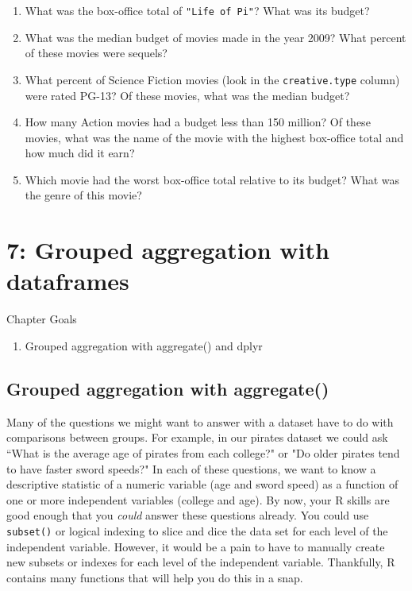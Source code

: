 \documentclass{tufte-book}\usepackage[]{graphicx}\usepackage[]{color}
\begin{document}
\begin{enumerate}

\item What was the box-office total of \texttt{"Life of Pi"}? What was its budget?

\item What was the median budget of movies made in the year 2009? What percent of these movies were sequels?

\item What percent of Science Fiction movies (look in the \texttt{creative.type} column) were rated PG-13? Of these movies, what was the median budget?

\item How many Action movies had a budget less than 150 million? Of these movies, what was the name of the movie with the highest box-office total and how much did it earn?

\item Which movie had the worst box-office total relative to its budget? What was the genre of this movie?

\end{enumerate}




\chapter{7: Grouped aggregation with dataframes}
\label{ch:7}


Chapter Goals

\begin{enumerate}
  \item Grouped aggregation with aggregate() and dplyr
\end{enumerate}

\section{Grouped aggregation with aggregate()}

Many of the questions we might want to answer with a dataset have to do with comparisons between groups. For example, in our pirates dataset we could ask ``What is the average age of pirates from each college?" or "Do older pirates tend to have faster sword speeds?" In each of these questions, we want to know a descriptive statistic of a numeric variable (age and sword speed) as a function of one or more independent variables (college and age). By now, your R skills are good enough that you \textit{could} answer these questions already. You could use \texttt{subset()} or logical indexing to slice and dice the data set for each level of the independent variable. However, it would be a pain to have to manually create new subsets or indexes for each level of the independent variable. Thankfully, R contains many functions that will help you do this in a snap.
\end{document}
